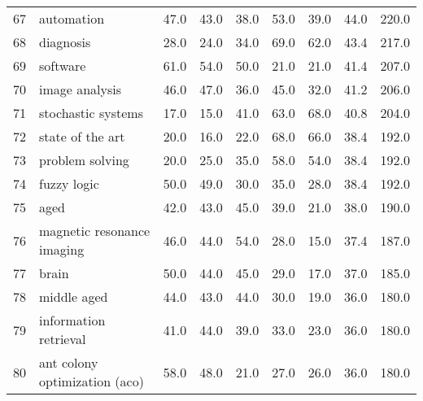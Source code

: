 \begin{tabular}{llrrrrrrr}
67 &                               automation &    47.0 &    43.0 &    38.0 &    53.0 &    39.0 &    44.0 &   220.0 \\
68 &                                diagnosis &    28.0 &    24.0 &    34.0 &    69.0 &    62.0 &    43.4 &   217.0 \\
69 &                                 software &    61.0 &    54.0 &    50.0 &    21.0 &    21.0 &    41.4 &   207.0 \\
70 &                           image analysis &    46.0 &    47.0 &    36.0 &    45.0 &    32.0 &    41.2 &   206.0 \\
71 &                       stochastic systems &    17.0 &    15.0 &    41.0 &    63.0 &    68.0 &    40.8 &   204.0 \\
72 &                         state of the art &    20.0 &    16.0 &    22.0 &    68.0 &    66.0 &    38.4 &   192.0 \\
73 &                          problem solving &    20.0 &    25.0 &    35.0 &    58.0 &    54.0 &    38.4 &   192.0 \\
74 &                              fuzzy logic &    50.0 &    49.0 &    30.0 &    35.0 &    28.0 &    38.4 &   192.0 \\
75 &                                     aged &    42.0 &    43.0 &    45.0 &    39.0 &    21.0 &    38.0 &   190.0 \\
76 &               magnetic resonance imaging &    46.0 &    44.0 &    54.0 &    28.0 &    15.0 &    37.4 &   187.0 \\
77 &                                    brain &    50.0 &    44.0 &    45.0 &    29.0 &    17.0 &    37.0 &   185.0 \\
78 &                              middle aged &    44.0 &    43.0 &    44.0 &    30.0 &    19.0 &    36.0 &   180.0 \\
79 &                    information retrieval &    41.0 &    44.0 &    39.0 &    33.0 &    23.0 &    36.0 &   180.0 \\
80 &            ant colony optimization (aco) &    58.0 &    48.0 &    21.0 &    27.0 &    26.0 &    36.0 &   180.0 \\
\bottomrule
\end{tabular}
